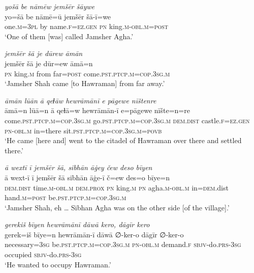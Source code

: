 \ea \label{DP.3}
\textit{yošā be nāmēw jemšēr šāywe} \\ 
\gll yo=šā be nāmē=ū jemšēr šā-ī=we \\ 
 one\textsc{.m}\textsc{=3pl} by name\textsc{\textsc{.f}}\textsc{=ez}\textsc{.gen} \textsc{pn} king\textsc{.m}\textsc{-obl}\textsc{.m}\textsc{=\textsc{post}} \\ 
\glt `One of them [was] called Jamsher Agha.'
\z 
 
\ea \label{DP.4}
\textit{jemšēr šā je dūrew āmān} \\ 
\gll jemšēr šā je dūr=ew āmā=n \\ 
 \textsc{pn} king\textsc{.m} from far\textsc{=\textsc{post}} come\textsc{.pst}\textsc{.ptcp}\textsc{.m}\textsc{=cop}\textsc{.3sg}\textsc{.m} \\ 
\glt `Jamsher Shah came [to Hawraman] from far away.'
\z 
 
\ea \label{DP.9}
\textit{āmān lūān ā qeɫāw hewrāmānī e pāgewe nīštenre} \\ 
\gll āmā=n lūā=n ā qeɫā=w hewrāmān-ī e=pāgewe nīšte=n=re \\ 
 come\textsc{.pst}\textsc{.ptcp}\textsc{.m}\textsc{=cop}\textsc{.3sg}\textsc{.m} go\textsc{.pst}\textsc{.ptcp}\textsc{.m}\textsc{=cop}\textsc{.3sg}\textsc{.m} \textsc{dem.dist} castle\textsc{\textsc{.f}}\textsc{=ez}\textsc{.gen} \textsc{pn}\textsc{-obl}\textsc{.m} in=there sit\textsc{.pst}\textsc{.ptcp}\textsc{.m}\textsc{=cop}\textsc{.3sg}\textsc{.m}\textsc{=\textsc{povb}} \\ 
\glt `He came [here and] went to the citadel of Hawraman over there and settled there.'
\z 
 
\ea \label{DP.12}
\textit{ā wextī ī jemšēr šā, sibhān āġey čew deso bīyen} \\ 
\gll ā wext-ī ī jemšēr šā sibhān āġe-ī č=ew des=o bīye=n \\ 
 \textsc{dem.dist} time\textsc{.m}\textsc{-obl}\textsc{.m} \textsc{dem.prox} \textsc{pn} king\textsc{.m} \textsc{pn} agha\textsc{.m}\textsc{-obl}\textsc{.m} in\textsc{=dem}.dist hand\textsc{.m}\textsc{=\textsc{post}} be\textsc{.pst}\textsc{.ptcp}\textsc{.m}\textsc{=cop}\textsc{.3sg}\textsc{.m} \\ 
\glt `Jamsher Shah, eh … Sibhan Agha was on the other side [of the village].'
\z 
 
\ea \label{DP.18}
\textit{gerekiš bīyen hewrāmānī dāwā kero, dāgīr kero} \\ 
\gll gerek=iš bīye=n hewrāmān-ī dāwā ∅-ker-o dāgīr ∅-ker-o \\ 
 necessary\textsc{=3sg} be\textsc{.pst}\textsc{.ptcp}\textsc{.m}\textsc{=cop}\textsc{.3sg}\textsc{.m} \textsc{pn}\textsc{-obl}\textsc{.m} demand\textsc{\textsc{.f}} \textsc{sbjv-}do\textsc{.prs}\textsc{-3sg} occupied \textsc{sbjv-}do\textsc{.prs}\textsc{-3sg} \\ 
\glt `He wanted to occupy Hawraman.'
\z 
 
